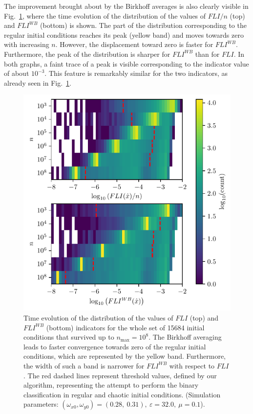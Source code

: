 The improvement brought about by the Birkhoff averages is also clearly visible in Fig.~\ref{fig:fli_colormap_mean_birk}, where the time evolution of the distribution of the values of $FLI/n$ (top) and $FLI^{WB}$ (bottom) is shown. The part of the distribution corresponding to the regular initial conditions reaches its peak (yellow band) and moves towards zero with increasing $n$. However, the displacement toward zero is faster for $FLI^{WB}$. Furthermore, the peak of the distribution is sharper for $FLI^{WB}$ than for $FLI$. In both graphs, a faint trace of a peak is visible corresponding to the indicator value of about $10^{-3}$. This feature is remarkably similar for the two indicators, as already seen in Fig.~\ref{fig:fli_colormap_mean_birk}.

\begin{figure}[htp]
    \centering
    \includegraphics[width=\columnwidth]{6_dynamic_indicators/figs/lyapunov_birkhoff_map.pdf}
    \caption{Time evolution of the distribution of the values of $FLI$ (top) and $FLI^{WB}$ (bottom) indicators for the whole set of 15684 initial conditions that survived up to $n_\text{max}=10^8$. The Birkhoff averaging leads to faster convergence towards zero of the regular initial conditions, which are represented by the yellow band. Furthermore, the width of such a band is narrower for $FLI^{WB}$ with respect to $FLI$. The red dashed lines represent threshold values, defined by our algorithm, representing the attempt to perform the binary classification in regular and chaotic initial conditions. (Simulation parameters: $(\omega_{x0},\omega_{y0})= (0.28,\ 0.31),\ \varepsilon=32.0,\  \mu=0.1$).}
    \label{fig:fli_colormap_mean_birk}
\end{figure}

